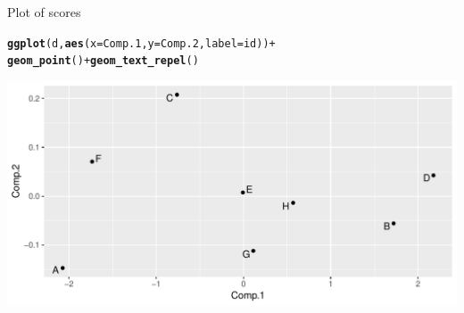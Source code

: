 \documentclass[unknownkeysallowed]{beamer}\usepackage[]{graphicx}\usepackage[]{color}
\makeatletter
\def\maxwidth{ %
  \ifdim\Gin@nat@width>\linewidth
    \linewidth
  \else
    \Gin@nat@width
  \fi
}
\newcommand{\hlopt}[1]{\textcolor[rgb]{0,0,0}{#1}}%
\newcommand{\hlstd}[1]{\textcolor[rgb]{0.345,0.345,0.345}{#1}}%
\newcommand{\hlkwc}[1]{\textcolor[rgb]{0.333,0.667,0.333}{#1}}%
\newcommand{\hlkwd}[1]{\textcolor[rgb]{0.737,0.353,0.396}{\textbf{#1}}}%
\newenvironment{kframe}{%
 \def\at@end@of@kframe{}%
 \ifinner\ifhmode%
  \def\at@end@of@kframe{\end{minipage}}%
  \begin{minipage}{\columnwidth}%
 \fi\fi%
 \def\FrameCommand##1{\hskip\@totalleftmargin \hskip-\fboxsep
 \colorbox{shadecolor}{##1}\hskip-\fboxsep
     \hskip-\linewidth \hskip-\@totalleftmargin \hskip\columnwidth}%
 \MakeFramed {\advance\hsize-\width
   \@totalleftmargin\z@ \linewidth\hsize
   \@setminipage}}%
 {\par\unskip\endMakeFramed%
 \at@end@of@kframe}
\newenvironment{knitrout}{}{} %
\makeatother
\begin{document}
\begin{frame}[fragile]{Plot of scores}

\begin{knitrout}
\color{fgcolor}\begin{kframe}
\begin{alltt}
\hlkwd{ggplot}\hlstd{(d,}\hlkwd{aes}\hlstd{(}\hlkwc{x}\hlstd{=Comp.1,}\hlkwc{y}\hlstd{=Comp.2,}\hlkwc{label}\hlstd{=id))}\hlopt{+}
  \hlkwd{geom_point}\hlstd{()}\hlopt{+}\hlkwd{geom_text_repel}\hlstd{()}
\end{alltt}
\end{kframe}
\includegraphics[width=\maxwidth]{figure/score-plot-1} 

\end{knitrout}

  
  
\end{frame}
\end{document}
